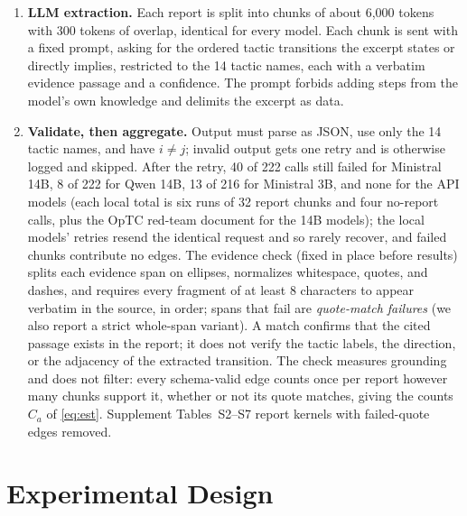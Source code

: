 \documentclass[letterpaper]{article}
\begin{document}
\begin{enumerate}\setlength{\itemsep}{1pt}\setlength{\parskip}{0pt}
\item \textbf{LLM extraction.} Each report is split into chunks of about 6,000 tokens with 300 tokens of overlap, identical for every model. Each chunk is sent with a fixed prompt, asking for the ordered tactic transitions the excerpt states or directly implies, restricted to the 14 tactic names, each with a verbatim evidence passage and a confidence. The prompt forbids adding steps from the model's own knowledge and delimits the excerpt as data.
\item \textbf{Validate, then aggregate.} Output must parse as JSON, use only the 14 tactic names, and have $i\neq j$; invalid output gets one retry and is otherwise logged and skipped. After the retry, 40 of 222 calls still failed for Ministral 14B, 8 of 222 for Qwen 14B, 13 of 216 for Ministral 3B, and none for the API models (each local total is six runs of 32 report chunks and four no-report calls, plus the OpTC red-team document for the 14B models); the local models' retries resend the identical request and so rarely recover, and failed chunks contribute no edges. The evidence check (fixed in place before results) splits each evidence span on ellipses, normalizes whitespace, quotes, and dashes, and requires every fragment of at least 8 characters to appear verbatim in the source, in order; spans that fail are \emph{quote-match failures} (we also report a strict whole-span variant). A match confirms that the cited passage exists in the report; it does not verify the tactic labels, the direction, or the adjacency of the extracted transition. The check measures grounding and does not filter: every schema-valid edge counts once per report however many chunks support it, whether or not its quote matches, giving the counts $C_a$ of \eqref{eq:est}. Supplement Tables~S2--S7 report kernels with failed-quote edges removed.
\end{enumerate}

\section{Experimental Design}
\end{document}
